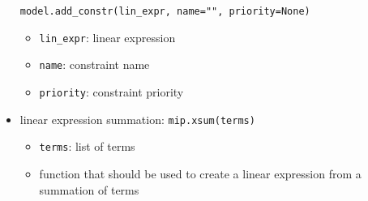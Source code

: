\documentclass[english]{article}
\begin{document}
\begin{itemize}
\begin{verbatim}
model.add_constr(lin_expr, name="", priority=None)
  \end{verbatim}
        \begin{itemize}
          \item \texttt{lin\_expr}: linear expression
          \item \texttt{name}: constraint name
          \item \texttt{priority}: constraint priority
        \end{itemize}
  \item linear expression summation: \texttt{mip.xsum(terms)}
        \begin{itemize}
          \item  \texttt{terms}: list of terms
          \item function that should be used to create a linear expression from a summation of terms
        \end{itemize}
\end{itemize}
\end{document}
